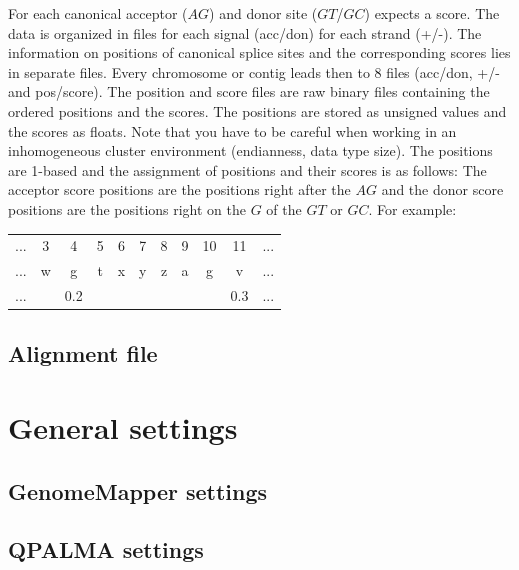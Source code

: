 \documentclass{article}
\begin{document}
For each canonical acceptor ($AG$) and donor site ($GT$/$GC$)
\QP{} expects a score. The data is organized in files for each signal
(acc/don) for each strand (+/-).  The information on positions of
canonical splice sites and the corresponding scores lies in separate
files. Every chromosome or contig leads then to $8$ files (acc/don, +/-
and pos/score). The position and score files are raw binary files
containing the ordered positions and the scores. The positions are
stored as unsigned values and the scores as floats. Note that you have
to be careful when working in an inhomogeneous cluster environment
(endianness, data type size). The positions are 1-based and the
assignment of positions and their scores is as follows: The acceptor
score positions are the positions right after the $AG$ and the donor
score positions are the positions right on the $G$ of the $GT$ or
$GC$. For example:
\begin{center}
\begin{tabular}{ccccccccccc}
... & 3 & 4 & 5 & 6 & 7 & 8 & 9 & 10 & 11 & ... \\ 
... & w & g & t & x & y & z & a & g  & v  & ... \\
... &   & 0.2&  &   &   &   &   &    & 0.3 & ... 
\end{tabular}
\end{center}

\subsection{Alignment file}
\label{sec:samfile}


\section{General settings}
\label{sec:settings}

\subsection{GenomeMapper settings}
\label{sec:settingsgm}

\subsection{QPALMA settings}
\label{sec:settingsqp}
\end{document}
